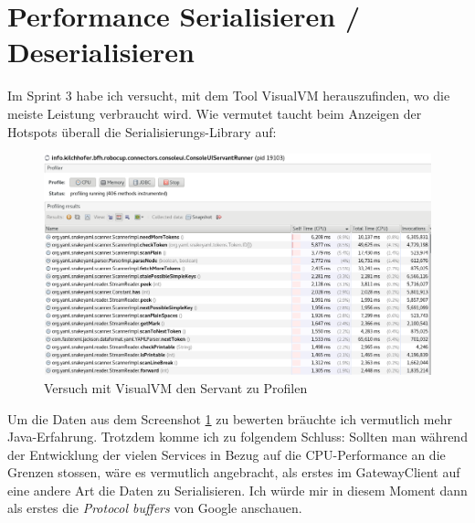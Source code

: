 \section{Performance Serialisieren / Deserialisieren}
Im Sprint 3 habe ich versucht, mit dem Tool VisualVM herauszufinden, wo die meiste Leistung verbraucht wird. Wie vermutet taucht beim Anzeigen der Hotspots überall die Serialisierungs-Library  auf:
\begin{figure}[H]
	\centering
	\includegraphics[width=1.0\textwidth]{img/profiling.png}
	\caption{Versuch mit VisualVM den Servant zu Profilen}
	\label{fig:profiling-servant}
\end{figure}
Um die Daten aus dem Screenshot \ref{fig:profiling-servant} zu bewerten bräuchte ich vermutlich mehr Java-Erfahrung. Trotzdem komme ich zu folgendem Schluss: Sollten man während der Entwicklung der vielen Services in Bezug auf die CPU-Performance an die Grenzen stossen, wäre es vermutlich angebracht, als erstes im GatewayClient auf eine andere Art die Daten zu Serialisieren. Ich würde mir in diesem Moment dann als erstes die \textit{Protocol buffers} von Google anschauen.